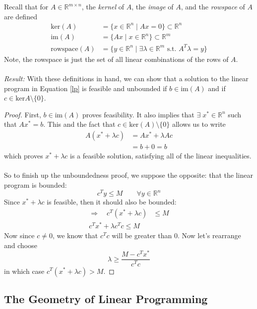 \documentclass[a4paper,12pt]{scrartcl}
\theoremstyle{definition}
\theoremstyle{remark}
\begin{document}
Recall that for $A \in \mathbb{R}^{m\times n}$, the \emph{kernel}
of $A$, the \emph{image} of $A$, and the \emph{rowspace}
of $A$ are defined
\begin{align*}
   \text{ker}(A) &= \{ x \in \mathbb{R}^n \; | \; Ax =0 \} \subset
      \mathbb{R}^n\\
   \text{im}(A) &= \{ A x \; | \; x\in \mathbb{R}^n \} \subset
      \mathbb{R}^m\\
   \text{rowspace}(A) &= \{ y \in \mathbb{R}^n \; | \; \exists \lambda
   \in \mathbb{R}^m \text{ s.t. } A^T \lambda = y \}
\end{align*}
Note, the rowspace is just the set of all linear combinations of the
rows of $A$.
\\
\\
{\sl Result:}
With these definitions in hand, we can show that a solution to the
linear program in Equation \ref{lp} is feasible and unbounded if
$b \in \text{im}(A)$ and if $c \in \text{ker} A \setminus \{ 0 \}$.
\begin{proof}
   First, $b \in \text{im}(A)$ proves feasibility. It also implies that
   $\exists\; x^* \in \mathbb{R}^n$ such that $A x^* = b$. This
   and the fact that $c \in \text{ker}(A)\setminus \{0\}$
   allows us to write
   \begin{align*}
      A(x^* + \lambda c) &= Ax^* + \lambda A c \\
      &= b + 0 = b
   \end{align*}
   which proves $x^* + \lambda c$ is a feasible solution, satisfying
   all of the linear inequalities.
   \\\\
   So to finish up the unboundedness proof, we suppose the opposite:
   that the linear program is bounded:
      \[ c^T y \leq M \qquad \forall y \in \mathbb{R}^n \]
   Since $x^* + \lambda c$ is feasible, then it should also be bounded:
   \begin{align*}
      \Rightarrow \quad c^T (x^* + \lambda c ) &\leq M\\
      c^T x^* + \lambda c^T c \leq M
   \end{align*}
   Now since $c \neq 0$, we know that $c^T c$ will be greater than
   0. Now let's rearrange and choose
      \[ \lambda \geq \frac{M - c^T x^*}{c^T c} \]
   in which case $c^T ( x^* + \lambda c) > M$.
\end{proof}



\newpage
\subsection{The Geometry of Linear Programming}
\end{document}
